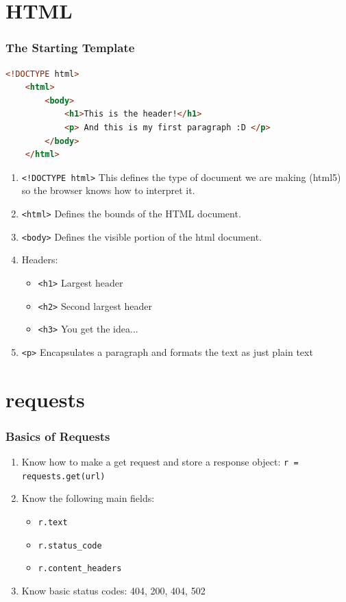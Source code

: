 \documentclass[xcolor=table]{beamer}
\begin{document}
\section{HTML}
%
%
\begin{frame}[fragile]
    \frametitle{The Starting Template}
    \begin{lstlisting}[language=html,autogobble]
    <!DOCTYPE html>
    <html>
        <body>
            <h1>This is the header!</h1>
            <p> And this is my first paragraph :D </p>
        </body>
    </html>
    \end{lstlisting} 
    \vfill
    \begin{enumerate}
        \item \lstinline|<!DOCTYPE html>| \textrightarrow This defines the type of document we are making (html5) so the browser knows how to interpret it.
        \item \lstinline|<html>| \textrightarrow Defines the bounds of the HTML document.
        \item \lstinline|<body>| \textrightarrow Defines the visible portion of the html document.
        \item Headers:
            \begin{itemize}
                \item \lstinline|<h1>| \textrightarrow Largest header
                \item \lstinline|<h2>| \textrightarrow Second largest header
                \item \lstinline|<h3>| \textrightarrow You get the idea...
            \end{itemize}
        \item \lstinline|<p>| \textrightarrow Encapsulates a paragraph and formats the text as just plain text
    \end{enumerate}
\end{frame}

\section{requests}
\begin{frame}[fragile]
    \frametitle{Basics of Requests}
    \begin{enumerate}[A]
        \item Know how to make a get request and store a response object: \lstinline|r = requests.get(url)|
        \item Know the following main fields:
            \begin{itemize}
                \item \lstinline|r.text|
                \item \lstinline|r.status_code|
                \item \lstinline|r.content_headers|
            \end{itemize}
        \item Know basic status codes: 404, 200, 404, 502
    \end{enumerate}
\end{frame}
\end{document}
